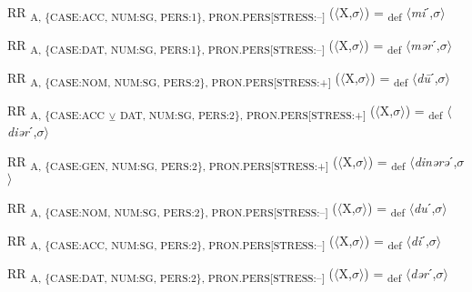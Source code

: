 {\begin{exe}
 RR \textsubscript{A, \{CASE:ACC, NUM:SG, PERS:1\}, PRON.PERS[STRESS:–]} ($\langle$X,$\sigma $$\rangle$) = \textsubscript{def} $\langle$\textit{mi}ˊ,$\sigma $$\rangle$
\end{exe}

\begin{exe}
 RR \textsubscript{A, \{CASE:DAT, NUM:SG, PERS:1\}, PRON.PERS[STRESS:–]} ($\langle$X,$\sigma $$\rangle$) = \textsubscript{def} $\langle$\textit{mər}ˊ,$\sigma $$\rangle$
\end{exe}

\begin{exe}
 RR \textsubscript{A, \{CASE:NOM, NUM:SG, PERS:2\}, PRON.PERS[STRESS:+]} ($\langle$X,$\sigma $$\rangle$) = \textsubscript{def} $\langle$\textit{d\=u}ˊ,$\sigma $$\rangle$
\end{exe}

\begin{exe}
 RR \textsubscript{A, \{CASE:ACC} \textsubscript{${\veebar}$}\textsubscript{ DAT, NUM:SG, PERS:2\}, PRON.PERS[STRESS:+]} ($\langle$X,$\sigma $$\rangle$) = \textsubscript{def} $\langle$\textit{diər}ˊ,$\sigma $$\rangle$
\end{exe}

\begin{exe}
 RR \textsubscript{A, \{CASE:GEN, NUM:SG, PERS:2\}, PRON.PERS[STRESS:+]} ($\langle$X,$\sigma $$\rangle$) = \textsubscript{def} $\langle$\textit{dinərə}ˊ,$\sigma $$\rangle$
\end{exe}

\begin{exe}
 RR \textsubscript{A, \{CASE:NOM, NUM:SG, PERS:2\}, PRON.PERS[STRESS:–]} ($\langle$X,$\sigma $$\rangle$) = \textsubscript{def} $\langle$\textit{du}ˊ,$\sigma $$\rangle$
\end{exe}

\begin{exe}
 RR \textsubscript{A, \{CASE:ACC, NUM:SG, PERS:2\}, PRON.PERS[STRESS:–]} ($\langle$X,$\sigma $$\rangle$) = \textsubscript{def} $\langle$\textit{di}ˊ,$\sigma $$\rangle$
\end{exe}

\begin{exe}
 RR \textsubscript{A, \{CASE:DAT, NUM:SG, PERS:2\}, PRON.PERS[STRESS:–]} ($\langle$X,$\sigma $$\rangle$) = \textsubscript{def} $\langle$\textit{dər}ˊ,$\sigma $$\rangle$
\end{exe}

}
